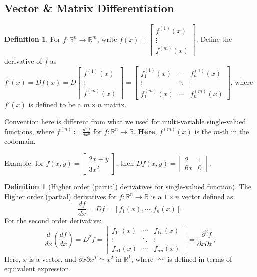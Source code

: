 \documentclass[12pt]{article}
\newcommand{\R}{{\mathbb R}}
\theoremstyle{definition}
\newtheorem{definition}[theorem]{Definition}
\theoremstyle{plain}
\begin{document}
\subsection{Vector \& Matrix Differentiation}
\setcounter{theorem}{0}
\begin{definition}
    For $f: \R^n \to \R^m$, write $f(x) = 
    \begin{bmatrix}
        f^{(1)}(x) \\
        \vdots \\
        f^{(m)}(x)
    \end{bmatrix}
    $.
    Define the derivative of $f$ as $f'(x) = Df(x) = D
    \begin{bmatrix}
        f^{(1)}(x) \\
        \vdots \\
        f^{(m)}(x)
    \end{bmatrix} = 
    \begin{bmatrix}
        f_1^{(1)} (x)  & \cdots  & f_n^{(1)} (x)\\
        \vdots & \ddots & \vdots \\
        f_1^{(m)}(x) & \cdots & f_n^{(m)} (x)
    \end{bmatrix}
    $, where $f'(x)$ is defined to be a $m \times n$ matrix.

    Convention here is different from what we used for multi-variable 
    single-valued functions, where $f^{(n)} \coloneqq \frac{d^n f}{d x^n}$ for 
    $f: \R^n \to \R$.
    \textbf{Here}, $f^{(m)}(x)$ is the $m$-th in the codomain.

    Example: for $f(x,y) = 
    \begin{bmatrix}
        2x + y\\3x^2
    \end{bmatrix}$, then 
    $D f(x,y) = 
    \begin{bmatrix}
        2   & 1 \\
        6 x & 0
    \end{bmatrix}
    $.

    \begin{definition}
        [Higher order (partial) derivatives for single-valued function]
        The Higher order (partial) derivatives for $f: \R^n \to \R$ is a $1 
        \times n$ vector defined as: 
        \[
            \frac{df }{d x} = Df = [f_1(x), \cdots, f_n(x)].
        \]
        For the second order derivative: 
        \[
            \frac{d}{dx}\left( \frac{d f}{dx} \right) = D^2 f = 
            \begin{bmatrix}
                f_{11}(x) & \cdots & f_{1n}(x) \\
                \vdots & \ddots & \vdots \\
                f_{n1}(x) & \cdots & f_{nn} (x)
            \end{bmatrix}
            = \frac{\partial^2 f }{\partial x \partial x^T}
        \]
        Here, $x$ is a vector, and $\partial x \partial x^T \simeq x^2$ in 
        $\R^1$, where $\simeq$ is defined in terms of equivalent expression.


\end{definition}
\end{definition}
\end{document}
